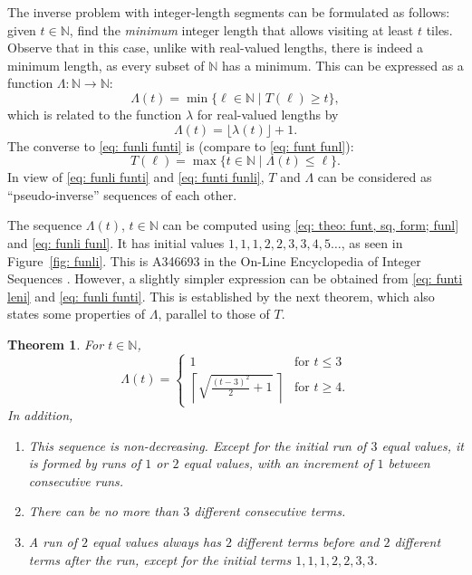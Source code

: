 \documentclass[12pt, a4paper]{article}
\newcommand{\st}{\mid}%
\newcommand{\funl}{\lambda} %
\newcommand{\funti}{T} %
\newcommand{\funli}{\Lambda} %
\newcommand{\leni}{\ell} %
\newcommand{\tiles}{t} %
\newtheorem{theorem}{Theorem}%
\begin{document}
The inverse problem with integer-length segments can be formulated as follows: given $\tiles \in \mathbb N$, find the \emph{minimum} integer length that allows visiting at least $\tiles$ tiles. Observe that in this case, unlike with real-valued lengths, there is indeed a minimum length, as every subset of $\mathbb N$ has a minimum. This can be expressed as a function $\funli: \mathbb N \to \mathbb N$:
\begin{equation}
\label{eq: funli funti}
\funli(\tiles) = \min\{\leni \in \mathbb N \st \funti(\leni) \geq \tiles\},
\end{equation}
which is related to the function $\funl$ for real-valued lengths by
\begin{equation}
\label{eq: funli funl}
\funli(\tiles) = \lfloor\funl(\tiles)\rfloor + 1.
\end{equation}
The converse to \eqref{eq: funli funti} is (compare to \eqref{eq: funt funl}):
\begin{equation}
\label{eq: funti funli}
\funti(\leni) = \max \{\tiles \in \mathbb N \st \funli(\tiles) \leq \leni\}.
\end{equation}
In view of \eqref{eq: funli funti} and \eqref{eq: funti funli}, $\funti$ and $\funli$ can be considered as ``pseudo-inverse'' sequences of each other.

The sequence $\funli(\tiles)$, $\tiles \in \mathbb N$ can be computed using \eqref{eq: theo: funt, sq, form; funl} and \eqref{eq: funli funl}. It has initial values $1, 1, 1, 2, 2, 3, 3, 4, 5 \ldots$, as seen in Figure~\ref{fig: funli}. This is A346693 in the On-Line Encyclopedia of Integer Sequences \cite{OEIS_unitsq_int_inv}. However, a slightly simpler expression can be obtained from \eqref{eq: funti leni} and \eqref{eq: funli funti}. This is established by the next theorem, which also states some properties of $\funli$, parallel to those of $\funti$.

\begin{theorem}
\label{theo: funli}
For $\tiles \in \mathbb N$,
\begin{equation}
\label{eq: funli}
\funli(\tiles) = \begin{cases}
\displaystyle
1 & \text{for } \tiles \leq 3 \\[1.3mm]
\displaystyle
\left \lceil \sqrt{\frac{(\tiles-3)^2} 2 + 1} \ \right \rceil & \text{for } \tiles \geq 4.
\end{cases}
\end{equation}
In addition,
\begin{enumerate}
\item
This sequence is non-decreasing. Except for the initial run of $3$ equal values, it is formed by runs of $1$ or $2$ equal values, with an increment of $1$ between consecutive runs.
\item
There can be no more than $3$ different consecutive terms.
\item
A run of $2$ equal values always has $2$ different terms before and $2$ different terms after the run, except for the initial terms $1, 1, 1, 2, 2, 3, 3$.
\end{enumerate}
\end{theorem}
\end{document}
